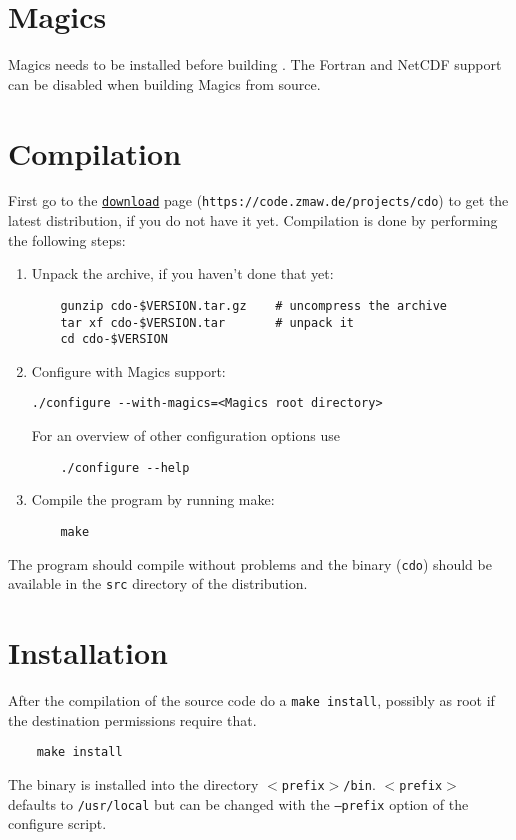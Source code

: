 \section{Magics}
 
Magics needs to be installed before building {\CDO}.
The Fortran and NetCDF support can be disabled when building Magics from source.

\section{Compilation}

First go to the {\CDO}  \href{https://code.zmaw.de/projects/cdo}{\tt download} page
({\tt https://code.zmaw.de/projects/cdo}) to get the latest distribution,
if you do not have it yet.
Compilation is done by performing the following steps:

\begin{enumerate}
\item Unpack the archive, if you haven't done that yet:
   
\begin{verbatim}
    gunzip cdo-$VERSION.tar.gz    # uncompress the archive
    tar xf cdo-$VERSION.tar       # unpack it
    cd cdo-$VERSION
\end{verbatim}

\item Configure {\CDO} with Magics support:
 
\begin{verbatim}
./configure --with-magics=<Magics root directory>
\end{verbatim}

For an overview of other configuration options use

\begin{verbatim}
    ./configure --help
\end{verbatim}

\item Compile the program by running make:

\begin{verbatim}
    make
\end{verbatim}

\end{enumerate}

The program should compile without problems and the binary ({\tt cdo}) 
should be available in the {\tt src} directory of the distribution.


\section{Installation}

After the compilation of the source code do a {\tt make install},
possibly as root if the destination permissions require that.

\begin{verbatim}
    make install
\end{verbatim} 

The binary is installed into the directory {\tt $<$prefix$>$/bin}.
{\tt $<$prefix$>$} defaults to {\tt /usr/local} but can be changed with 
the {\tt --prefix} option of the configure script. 
